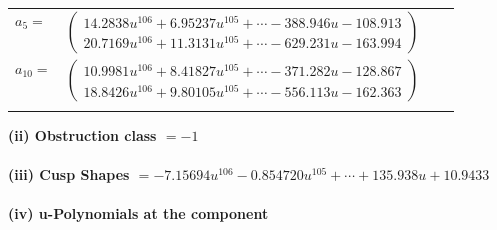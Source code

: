 \documentclass[1p]{elsarticle_modified}
\theoremstyle{definition}
\begin{document}
\begin{tabular}{m{7pt} m{180pt} m{7pt} m{180pt} }
\flushright $a_{5}=$&$\begin{pmatrix}14.2838 u^{106}+6.95237 u^{105}+\cdots-388.946 u-108.913\\20.7169 u^{106}+11.3131 u^{105}+\cdots-629.231 u-163.994\end{pmatrix}$ \\
\flushright $a_{10}=$&$\begin{pmatrix}10.9981 u^{106}+8.41827 u^{105}+\cdots-371.282 u-128.867\\18.8426 u^{106}+9.80105 u^{105}+\cdots-556.113 u-162.363\end{pmatrix}$\\&\end{tabular}
\flushleft \textbf{(ii) Obstruction class $= -1$}\\~\\
\flushleft \textbf{(iii) Cusp Shapes $= -7.15694 u^{106}-0.854720 u^{105}+\cdots+135.938 u+10.9433$}\\~\\
\newpage\renewcommand{\arraystretch}{1}
\flushleft \textbf{(iv) u-Polynomials at the component}\newline \\
\end{document}
